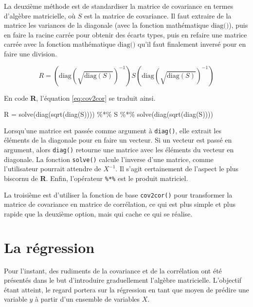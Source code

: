 \documentclass[
]{book}
\newenvironment{Shaded}{}{}
\newcommand{\FunctionTok}[1]{#1}
\newcommand{\NormalTok}[1]{#1}
\newcommand{\OtherTok}[1]{#1}
\newcommand{\SpecialCharTok}[1]{#1}
\begin{document}
La deuxième méthode est de standardiser la matrice de covariance en termes d'algèbre matricielle, où \(S\) est la matrice de covariance. Il faut extraire de la matrice les variances de la diagonale (avec la fonction mathématique \(\text{diag()}\)), puis en faire la racine carrée pour obtenir des écarts types, puis en refaire une matrice carrée avec la fonction mathématique \(\text{diag()}\) qu'il faut finalement inversé pour en faire une division.

\begin{equation}
R = (\text{diag}(\sqrt{\text{diag}(S)})^{-1}) S (\text{diag}(\sqrt{\text{diag}(S)})^{-1})
\label{eq:cov2cor}
\end{equation}

En code \textbf{R}, l'équation \eqref{eq:cov2cor} se traduit ainsi.

\begin{Shaded}
\begin{Highlighting}[]
\NormalTok{R }\OtherTok{=} \FunctionTok{solve}\NormalTok{(}\FunctionTok{diag}\NormalTok{(}\FunctionTok{sqrt}\NormalTok{(}\FunctionTok{diag}\NormalTok{(S)))) }\SpecialCharTok{\%*\%}\NormalTok{ S }\SpecialCharTok{\%*\%} \FunctionTok{solve}\NormalTok{(}\FunctionTok{diag}\NormalTok{(}\FunctionTok{sqrt}\NormalTok{(}\FunctionTok{diag}\NormalTok{(S))))}
\end{Highlighting}
\end{Shaded}

Lorsqu'une matrice est passée comme argument à \texttt{diag()}, elle extrait les éléments de la diagonale pour en faire un vecteur. Si un vecteur est passé en argument, alors \texttt{diag()} retourne une matrice avec les éléments du vecteur en diagonale. La fonction \texttt{solve()} calcule l'inverse d'une matrice, comme l'utilisateur pourrait attendre de \(X^{-1}\). Il s'agit certainement de l'aspect le plus biscornu de \textbf{R}. Enfin, l'opérateur \texttt{\%*\%} est le produit matriciel.

La troisième est d'utiliser la fonction de base \texttt{cov2cor()} pour transformer la matrice de covariance en matrice de corrélation, ce qui est plus simple et plus rapide que la deuxième option, mais qui cache ce qui se réalise.

\hypertarget{la-ruxe9gression}{%
\section{La régression}\label{la-ruxe9gression}}

Pour l'instant, des rudiments de la covariance et de la corrélation ont été présentés dans le but d'introduire graduellement l'algèbre matricielle. L'objectif étant atteint, le regard portera sur la régression en tant que moyen de prédire une variable \(y\) à partir d'un ensemble de variables \(X\).
\end{document}
